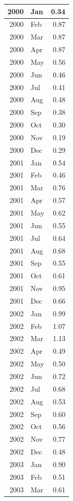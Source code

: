 \documentclass[
]{article}
\begin{document}
\begin{table}[H]
\begin{tabular}[t]{r|l|r}
\hline
2000 & Jan & 0.34\\
\hline
2000 & Feb & 0.87\\
\hline
2000 & Mar & 0.87\\
\hline
2000 & Apr & 0.87\\
\hline
2000 & May & 0.56\\
\hline
2000 & Jun & 0.46\\
\hline
2000 & Jul & 0.41\\
\hline
2000 & Aug & 0.48\\
\hline
2000 & Sep & 0.38\\
\hline
2000 & Oct & 0.30\\
\hline
2000 & Nov & 0.19\\
\hline
2000 & Dec & 0.29\\
\hline
2001 & Jan & 0.54\\
\hline
2001 & Feb & 0.46\\
\hline
2001 & Mar & 0.76\\
\hline
2001 & Apr & 0.57\\
\hline
2001 & May & 0.62\\
\hline
2001 & Jun & 0.55\\
\hline
2001 & Jul & 0.64\\
\hline
2001 & Aug & 0.68\\
\hline
2001 & Sep & 0.55\\
\hline
2001 & Oct & 0.61\\
\hline
2001 & Nov & 0.95\\
\hline
2001 & Dec & 0.66\\
\hline
2002 & Jan & 0.99\\
\hline
2002 & Feb & 1.07\\
\hline
2002 & Mar & 1.13\\
\hline
2002 & Apr & 0.49\\
\hline
2002 & May & 0.50\\
\hline
2002 & Jun & 0.72\\
\hline
2002 & Jul & 0.68\\
\hline
2002 & Aug & 0.53\\
\hline
2002 & Sep & 0.60\\
\hline
2002 & Oct & 0.56\\
\hline
2002 & Nov & 0.77\\
\hline
2002 & Dec & 0.48\\
\hline
2003 & Jan & 0.90\\
\hline
2003 & Feb & 0.51\\
\hline
2003 & Mar & 0.61\\

\end{tabular}
\end{table}
\end{document}
